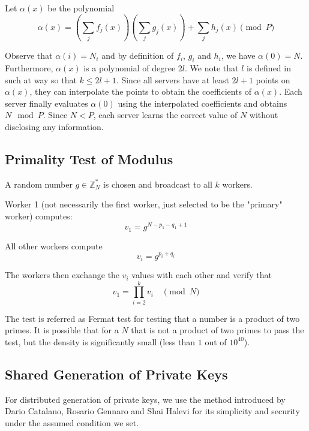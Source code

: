 Let $\alpha(x)$ be the polynomial
\begin{equation}
  \alpha(x) = \left( \sum_j f_j(x)\right) \left( \sum_j g_j(x)\right) + \sum_j h_j(x) \pmod{ P}
\end{equation}

Observe that $\alpha(i) = N_i$ and by definition of $f_i$, $g_i$ and $h_i$, we have $\alpha(0) = N$. Furthermore, $\alpha(x)$ is a polynomial of degree $2l$. We note that $l$ is defined in such at way so that $k \leq 2l + 1$. Since all servers have at least $2l + 1$ points on $\alpha(x)$, they can interpolate the points to obtain the coefficients of $\alpha(x)$. Each server finally evaluates $\alpha(0)$ using the interpolated coefficients and obtains $N \mod P$. Since $N < P$, each server learns the correct value of $N$ without disclosing any information.

\subsection{Primality Test of Modulus}

A random number $g \in \mathbb{Z}_N^*$ is chosen and broadcast to all $k$ workers.

Worker 1 (not necessarily the first worker, just selected to be the "primary" worker) computes:
\begin{equation}
  v_1 = g^{N - p_1 - q_1 + 1}
\end{equation}

All other workers compute
\begin{equation}
  v_i = g^{p_i + q_i}
\end{equation}

The workers then exchange the $v_i$ values with each other and verify that
\begin{equation}
  v_1 = \prod_{i=2}^{k} v_i \quad \pmod{ N}
\end{equation}

The test is referred as Fermat test for testing that a number is a product of two primes. It is possible that for a $N$ that is not a product of two primes to pass the test, but the density is significantly small (less than $1$ out of $10^{40}$).

\subsection{Shared Generation of Private Keys}

For distributed generation of private keys, we use the method introduced by Dario Catalano, Rosario Gennaro and Shai Halevi for its simplicity and security under the
assumed condition we set.

